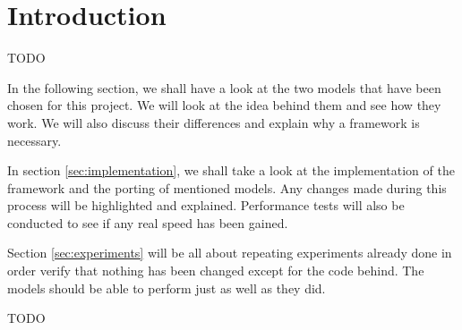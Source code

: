 \section{Introduction}

TODO

In the following section, we shall have a look at the two models that have been chosen for this project. We will look at the idea behind them and see how they work. We will also discuss their differences and explain why a framework is necessary.

In section \ref{sec:implementation}, we shall take a look at the implementation of the framework and the porting of mentioned models. Any changes made during this process will be highlighted and explained. Performance tests will also be conducted to see if any real speed has been gained.

Section \ref{sec:experiments} will be all about repeating experiments already done in order verify that nothing has been changed except for the code behind. The models should be able to perform just as well as they did.

TODO

